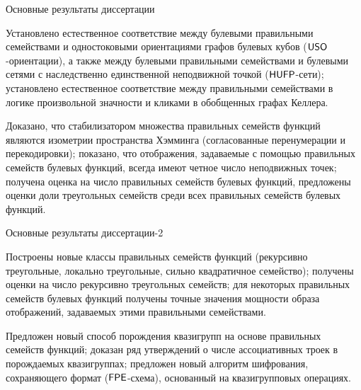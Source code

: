 \begin{frame}{Основные результаты диссертации}
    \begin{coloritemize}
        \item Установлено естественное соответствие между булевыми правильными семействами и одностоковыми ориентациями графов булевых кубов ($\mathsf{USO}$-ориентации), а также между булевыми правильными семействами и булевыми сетями с наследственно единственной неподвижной точкой ($\mathsf{HUFP}$-сети); установлено естественное соответствие между правильными семействами в логике произвольной значности и кликами в обобщенных графах Келлера.
        \pause 
        \item Доказано, что стабилизатором множества правильных семейств функций являются изометрии пространства Хэмминга (согласованные перенумерации и перекодировки); показано, что отображения, задаваемые с помощью правильных семейств булевых функций, всегда имеют четное число неподвижных точек; 
        получена оценка на число правильных семейств булевых функций, предложены оценки доли треугольных семейств среди всех правильных семейств булевых функций.
        \end{coloritemize}
\end{frame}


\begin{frame}{Основные результаты диссертации-2}
    \begin{coloritemize}
        \item Построены новые классы правильных семейств функций (рекурсивно треугольные, локально треугольные, сильно квадратичное семейство); получены оценки на число рекурсивно треугольных семейств; для некоторых правильных семейств булевых функций получены точные значения мощности образа отображений, задаваемых этими правильными семействами.
        \pause
        \item Предложен новый способ порождения квазигрупп на основе правильных семейств функций; доказан ряд утверждений о числе ассоциативных троек в порождаемых квазигруппах; предложен новый алгоритм шифрования, сохраняющего формат ($\mathsf{FPE}$-схема), основанный на квазигрупповых операциях.
    \end{coloritemize}
\end{frame}


